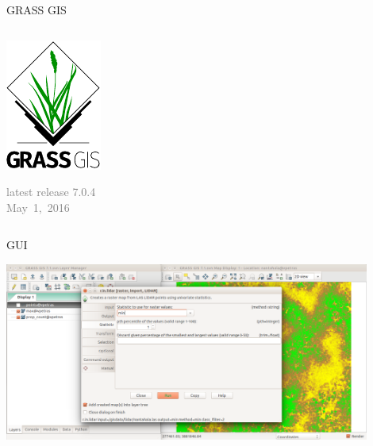 \documentclass[xcolor={dvipsnames,usenames},beamer,aspectratio=169]{beamer}
\begin{document}
\begin{frame}{GRASS GIS}
\begin{columns}
\begin{column}{0.3\textwidth}
\begin{center}
  \includegraphics[width=\textwidth]{logos/grass_gis}
\end{center}

\textcolor{gray}{
\footnotesize
latest release 7.0.4 \\May~1,~2016
}

\end{column}
\end{columns}

\end{frame}


\begin{frame}{GUI}

\begin{center}
  \includegraphics[width=0.9\textwidth]{grass/r_in_lidar_gui}
\end{center}

\end{frame}
\end{document}
